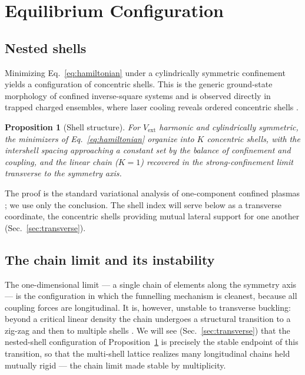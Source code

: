 \documentclass[twocolumn,10pt,a4paper]{article}
\theoremstyle{thmstyle}
\newtheorem{proposition}[theorem]{Proposition}
\theoremstyle{definition}
\theoremstyle{remark}
\begin{document}
\section{Equilibrium Configuration}
\label{sec:equilibrium}

\subsection{Nested shells}

Minimizing Eq.~\eqref{eq:hamiltonian} under a cylindrically symmetric
confinement yields a configuration of concentric shells. This is the
generic ground-state morphology of confined inverse-square systems and is
observed directly in trapped charged ensembles, where laser cooling reveals
ordered concentric shells \citep{birkl1992,dubin1999}.

\begin{proposition}[Shell structure]
\label{prop:shells}
For $V_{\mathrm{ext}}$ harmonic and cylindrically symmetric, the minimizers
of Eq.~\eqref{eq:hamiltonian} organize into $K$ concentric shells, with the
intershell spacing approaching a constant set by the balance of confinement
and coupling, and the linear chain ($K=1$) recovered in the strong-confinement
limit transverse to the symmetry axis.
\end{proposition}

\noindent The proof is the standard variational analysis of one-component
confined plasmas \citep{dubin1999}; we use only the conclusion. The shell
index will serve below as a transverse coordinate, the concentric shells
providing mutual lateral support for one another
(Sec.~\ref{sec:transverse}).

\subsection{The chain limit and its instability}

The one-dimensional limit --- a single chain of elements along the symmetry
axis --- is the configuration in which the funnelling mechanism is cleanest,
because all coupling forces are longitudinal. It is, however, unstable to
transverse buckling: beyond a critical linear density the chain undergoes a
structural transition to a zig-zag and then to multiple shells
\citep{fishman2008}. We will see (Sec.~\ref{sec:transverse}) that the
nested-shell configuration of Proposition~\ref{prop:shells} is precisely the
stable endpoint of this transition, so that the multi-shell lattice realizes
many longitudinal chains held mutually rigid --- the chain limit made stable
by multiplicity.
\end{document}
